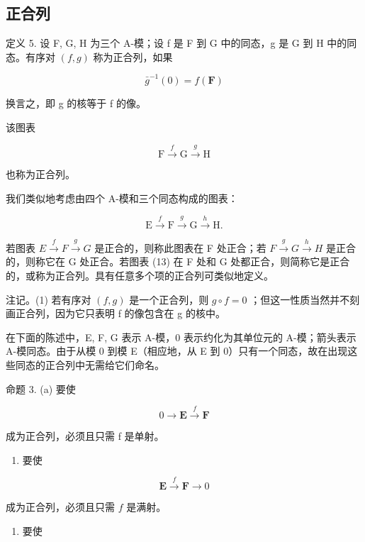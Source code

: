 \subsection{正合列}

定义 5. 设 F, G, H 为三个 A-模；设 f 是 F 到 G 中的同态，g 是 G 到 H 中的同态。有序对 \((f, g)\) 称为正合列，如果

\[
\bar {g} ^ {- 1} (0) = f (\mathbf {F})
\]

换言之，即 g 的核等于 f 的像。

该图表

\[
\mathrm{F} \xrightarrow {f} \mathrm{G} \xrightarrow {g} \mathrm{H}\tag{12}
\]

也称为正合列。

我们类似地考虑由四个 A-模和三个同态构成的图表：

\[
\mathrm{E} \xrightarrow {f} \mathrm{F} \xrightarrow {g} \mathrm{G} \xrightarrow {h} \mathrm{H}.\tag{13}
\]

若图表 \(E \xrightarrow{f} F \xrightarrow{g} G\) 是正合的，则称此图表在 F 处正合；若 \(F \xrightarrow{g} G \xrightarrow{h} H\) 是正合的，则称它在 G 处正合。若图表 (13) 在 F 处和 G 处都正合，则简称它是正合的，或称为正合列。具有任意多个项的正合列可类似地定义。

注记。(1) 若有序对 \((f, g)\) 是一个正合列，则 \(g \circ f = 0\) ；但这一性质当然并不刻画正合列，因为它只表明 f 的像包含在 g 的核中。

在下面的陈述中，E, F, G 表示 A-模，0 表示约化为其单位元的 A-模；箭头表示 A-模同态。由于从模 0 到模 E（相应地，从 E 到 0）只有一个同态，故在出现这些同态的正合列中无需给它们命名。

命题 3. (a) 要使

\[
0 \longrightarrow \mathbf {E} \stackrel {f} {\longrightarrow} \mathbf {F}
\]

成为正合列，必须且只需 f 是单射。

\begin{enumerate}
\def\labelenumi{(\alph{enumi})}
\setcounter{enumi}{1}
\tightlist
\item
  要使
\end{enumerate}

\[
\mathbf {E} \xrightarrow {f} \mathbf {F} \longrightarrow 0
\]

成为正合列，必须且只需 \(f\) 是满射。

\begin{enumerate}
\def\labelenumi{(\alph{enumi})}
\setcounter{enumi}{2}
\tightlist
\item
  要使
\end{enumerate}

